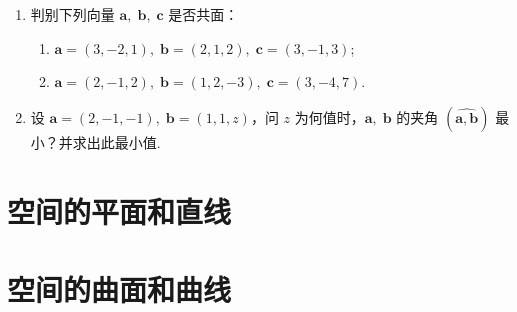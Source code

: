 \begin{enumerate}
    \item 判别下列向量 $\boldsymbol{a},\;\boldsymbol{b},\;\boldsymbol{c}$ 是否共面：
    \begin{enumerate}[(1)]\setlength{\itemsep}{5pt}\setlength{\topsep}{15pt}
        \item $\boldsymbol{a}=(3, -2, 1),\;\boldsymbol{b}=(2, 1, 2),\;\boldsymbol{c}=(3, -1, 3)$;
        \item $\boldsymbol{a}=(2, -1, 2),\;\boldsymbol{b}=(1, 2, -3),\;\boldsymbol{c}=(3, -4, 7)$.
    \end{enumerate}

    \item 设 $\boldsymbol{a}=(2, -1, -1),\;\boldsymbol{b}=(1, 1, z)$，问 $z$ 为何值时，$\boldsymbol{a},\;\boldsymbol{b}$ 的夹角 $(\widehat{\boldsymbol{a}, \boldsymbol{b}})$ 最小？并求出此最小值.
\end{enumerate}

\section{空间的平面和直线}

\section{空间的曲面和曲线}





